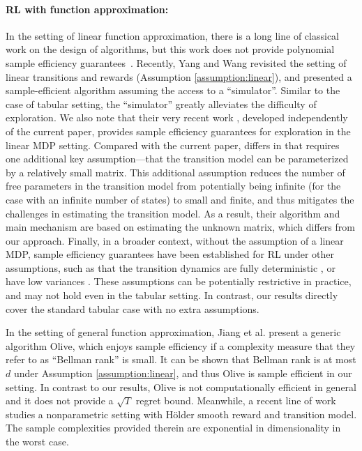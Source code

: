\paragraph{RL with function approximation:} In the setting of linear function approximation, there is a long line of classical work on the design of algorithms, but this work does not provide polynomial sample efficiency guarantees~\cite[see, e.g.,][]{bradtke1996linear, melo2007q, sutton2011reinforcement, osband2014generalization, azizzadenesheli2018efficient}.  Recently, Yang and Wang \cite{yang2019sample} revisited the setting of linear transitions and rewards \cite{bradtke1996linear, melo2007q} (Assumption \ref{assumption:linear}), and presented a sample-efficient algorithm assuming the access to a ``simulator''. Similar to the case of tabular setting, the ``simulator'' greatly alleviates the difficulty of exploration. We also note that their very recent work \cite{yang2019reinforcement}, developed independently of the current paper, provides sample efficiency guarantees for exploration in the linear MDP setting. Compared with the current paper, \cite{yang2019reinforcement} differs in that requires one additional key assumption---that the transition model can be parameterized by a relatively small matrix. This additional assumption reduces the number of free parameters in the transition model from potentially being infinite (for the case with an infinite number of states) 
to small and finite, and thus mitigates the challenges in estimating the transition model. As a result, their algorithm and main mechanism are based on estimating the unknown matrix, which differs from our approach. Finally, in a broader context, without the assumption of a linear MDP, sample efficiency guarantees have been established for RL under other assumptions, such as that the transition dynamics are fully deterministic \cite{wen2013efficient, wen2017efficient}, or have low variances \cite{du2019provably}. These assumptions can be potentially restrictive in practice, and may not hold even in the tabular setting. In contrast, our results directly cover the standard tabular case with no extra assumptions.


In the setting of general function approximation, Jiang et al. \cite{jiang2017contextual} present a generic algorithm Olive, which enjoys sample efficiency if a complexity measure that they refer to as ``Bellman rank'' is small. It can be shown that Bellman rank is at most $d$ under Assumption \ref{assumption:linear}, and thus Olive is sample efficient in our setting. In contrast to our results, Olive is not computationally efficient in general and it does not provide a $\sqrt{T}$ regret bound. Meanwhile, a recent line of work \cite{zhu2019lipschitz, wang2019towards} studies a nonparametric setting with H\"older smooth reward and transition model. The sample complexities provided therein are exponential in dimensionality in the worst case. 

